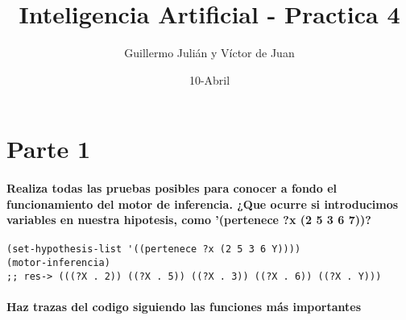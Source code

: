 \documentclass[nochap]{apuntes}
\author{Guillermo Julián y Víctor de Juan}
\date{10-Abril}
\title{Inteligencia Artificial - Practica 4}
\begin{document}
\maketitle
\section*{Parte 1}
\paragraph{Realiza todas las pruebas posibles para conocer a fondo el funcionamiento del motor de inferencia. ¿Que ocurre si introducimos variables en nuestra hipotesis, como '(pertenece ?x (2 5 3 6 7))?}

\begin{lstlisting}
(set-hypothesis-list '((pertenece ?x (2 5 3 6 Y))))
(motor-inferencia)
;; res-> (((?X . 2)) ((?X . 5)) ((?X . 3)) ((?X . 6)) ((?X . Y)))
\end{lstlisting}


\paragraph{ Haz trazas del codigo siguiendo las funciones más importantes\\}
\end{document}
